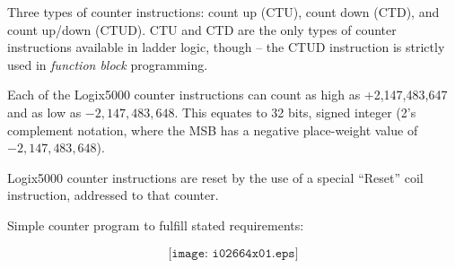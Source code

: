 












Three types of counter instructions: count up (CTU), count down (CTD), and count up/down (CTUD).  CTU and CTD are the only types of counter instructions available in ladder logic, though -- the CTUD instruction is strictly used in {\it function block} programming.

\vskip 10pt

Each of the Logix5000 counter instructions can count as high as +2,147,483,647 and as low as $-2,147,483,648$.  This equates to 32 bits, signed integer (2's complement notation, where the MSB has a negative place-weight value of $-2,147,483,648$).

\vskip 10pt

Logix5000 counter instructions are reset by the use of a special ``Reset'' coil instruction, addressed to that counter.

\vskip 10pt

Simple counter program to fulfill stated requirements:

$$\texttt{[image: i02664x01.eps]}$$





